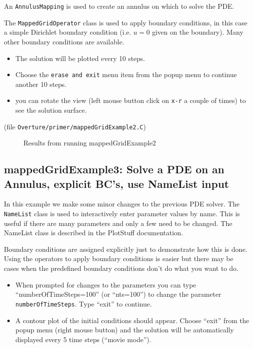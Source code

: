 \documentclass{article}
\begin{document}
An {\tt AnnulusMapping} is used to create an annulus on which to solve the PDE.

The {\tt MappedGridOperator} class is used to apply boundary conditions, in this
case a simple Dirichlet boundary condition (i.e. $u=0$ given on the boundary).
Many other boundary conditions are available.

\begin{itemize}
 \item The solution will be plotted every 10 steps. 
 \item Choose the {\tt erase and exit} menu item from the popup menu to continue another 10 steps.
 \item you can rotate the view (left mouse button click on {\tt x-r} a couple of times) to 
       see the solution surface.
\end{itemize}

(file {\tt Overture/primer/mappedGridExample2.C})
{\footnotesize
{}
}
\begin{figure}[htb]
  \begin{center}
  \caption{Results from running mappedGridExample2} 
  \end{center}
\end{figure}

\vfill\eject
\subsection{mappedGridExample3:  Solve a PDE on an Annulus, explicit BC's, use NameList input}

In this example we make some minor changes to the previous PDE solver. 
The {\tt NameList} class is used to interactively enter parameter values by name. This is useful
if there are many parameters and only a few need to be changed. The NameList class is described
in the PlotStuff documentation.

Boundary conditions are assigned explicitly just to demonstrate how this is done. Using the
operators to apply boundary conditions is easier but there may be cases when the predefined
boundary conditions don't do what you want to do.




\begin{itemize}
 \item When prompted for changes to the parameters you can type ``numberOfTimeSteps=100''
   (or ``nts=100'') to change the parameter {\tt numberOfTimeSteps}. Type ``exit'' to 
   continue.
 \item A contour plot of the initial conditions should appear. Choose ``exit'' from 
      the popup menu (right mouse button) and the solution will be automatically displayed
      every 5 time steps (``movie mode'').
\end{itemize}
\end{document}
